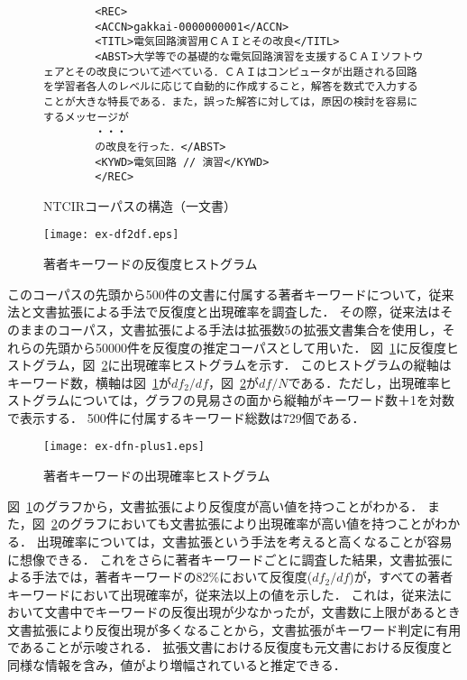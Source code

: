 \documentclass[japanese]{jnlp_1.2c}
\begin{document}
\begin{figure}[t]
	\centering
	\begin{screen}
		\begin{verbatim}
		<REC>
		<ACCN>gakkai-0000000001</ACCN>
		<TITL>電気回路演習用ＣＡＩとその改良</TITL>
		<ABST>大学等での基礎的な電気回路演習を支援するＣＡＩソフトウェアとその改良について述べている．ＣＡＩはコンピュータが出題される回路を学習者各人のレベルに応じて自動的に作成すること，解答を数式で入力することが大きな特長である．また，誤った解答に対しては，原因の検討を容易にするメッセージが
		・・・
		の改良を行った．</ABST>
		<KYWD>電気回路 // 演習</KYWD>
		</REC>

		\end{verbatim}
	\end{screen}
	\caption{NTCIRコーパスの構造（一文書）}
	\label{fig:corpus}
    \vspace{20pt}
	\begin{center}
		\texttt{[image: ex-df2df.eps]}
	\end{center}
	\caption{著者キーワードの反復度ヒストグラム}
	\label{fig:ex-df2df}
\end{figure}


このコーパスの先頭から500件の文書に付属する著者キーワードについて，従来法と文書拡張による手法で反復度と出現確率を調査した．
その際，従来法はそのままのコーパス，文書拡張による手法は拡張数5の拡張文書集合を使用し，それらの先頭から50000件を反復度の推定コーパスとして用いた．
図~\ref{fig:ex-df2df}に反復度ヒストグラム，図~\ref{fig:ex-dfn}に出現確率ヒストグラムを示す．
このヒストグラムの縦軸はキーワード数，横軸は図~\ref{fig:ex-df2df}が$df_2/df$，図~\ref{fig:ex-dfn}が$df/N$である．ただし，出現確率ヒストグラムについては，グラフの見易さの面から縦軸がキーワード数＋1を対数で表示する．
500件に付属するキーワード総数は729個である．

\begin{figure}[t]
	\begin{center}
		\texttt{[image: ex-dfn-plus1.eps]}
	\end{center}
	\caption{著者キーワードの出現確率ヒストグラム}
	\label{fig:ex-dfn}
\end{figure}

図~\ref{fig:ex-df2df}のグラフから，文書拡張により反復度が高い値を持つことがわかる．
また，図~\ref{fig:ex-dfn}のグラフにおいても文書拡張により出現確率が高い値を持つことがわかる．
出現確率については，文書拡張という手法を考えると高くなることが容易に想像できる．
これをさらに著者キーワードごとに調査した結果，文書拡張による手法では，著者キーワードの82\%において反復度($df_2/df$)が，すべての著者キーワードにおいて出現確率が，従来法以上の値を示した．
これは，従来法において文書中でキーワードの反復出現が少なかったが，文書数に上限があるとき文書拡張により反復出現が多くなることから，文書拡張がキーワード判定に有用であることが示唆される．
拡張文書における反復度も元文書における反復度と同様な情報を含み，値がより増幅されていると推定できる．
\end{document}
